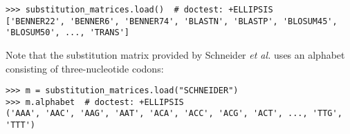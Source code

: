 \begin{verbatim}
>>> substitution_matrices.load()  # doctest: +ELLIPSIS
['BENNER22', 'BENNER6', 'BENNER74', 'BLASTN', 'BLASTP', 'BLOSUM45', 'BLOSUM50', ..., 'TRANS']
\end{verbatim}

\hypertarget{codonmatrix}{
Note that the substitution matrix provided by Schneider \textit{et al.} \cite{schneider2005} uses an alphabet consisting of three-nucleotide codons:
}

\begin{verbatim}
>>> m = substitution_matrices.load("SCHNEIDER")
>>> m.alphabet  # doctest: +ELLIPSIS
('AAA', 'AAC', 'AAG', 'AAT', 'ACA', 'ACC', 'ACG', 'ACT', ..., 'TTG', 'TTT')
\end{verbatim}
